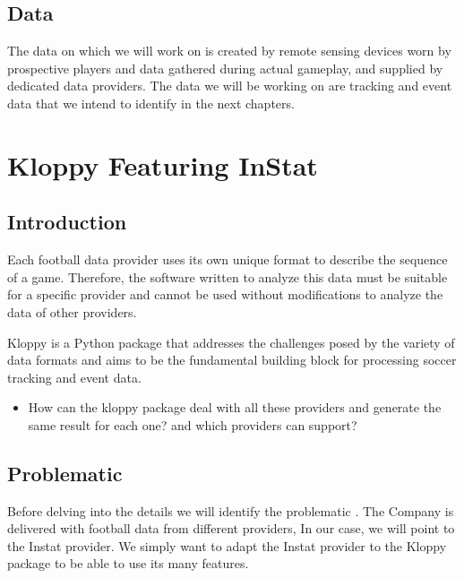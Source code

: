 \documentclass[letterpaper,10pt,english]{jupyterBook}
\begin{document}
\section{Data}
\label{\detokenize{Introduction/introduction:data}}
\sphinxAtStartPar
The data on which we will work on is created by remote sensing devices worn by prospective players and data  gathered during actual gameplay, and supplied by dedicated data providers.
The data we will be working on are tracking and event data that we intend to identify in the next chapters.


\chapter{Kloppy Featuring InStat}
\label{\detokenize{Chap1/Chap1:kloppy-featuring-instat}}\label{\detokenize{Chap1/Chap1::doc}}

\section{Introduction}
\label{\detokenize{Chap1/Chap1:introduction}}
\sphinxAtStartPar
Each football data provider uses its own unique format to describe the sequence of a game.
Therefore, the software written to analyze this data must be suitable for a specific provider and cannot be used without modifications to analyze the data of other providers.

\sphinxAtStartPar
Kloppy is a Python package that addresses the challenges posed by the variety of data formats and aims to be the fundamental building block for processing soccer tracking and event data.
\begin{itemize}
\item {} 
\sphinxAtStartPar
How can the kloppy package deal with all these providers and generate the same result for each one? and which providers can support?

\end{itemize}


\section{Problematic}
\label{\detokenize{Chap1/Chap1:problematic}}
\sphinxAtStartPar
Before delving into the details we will identify the problematic . The Company is delivered with football data from different providers, In our case, we will point to the Instat provider. We simply want to adapt the Instat provider to the Kloppy package to be able to use its many features.
\end{document}
